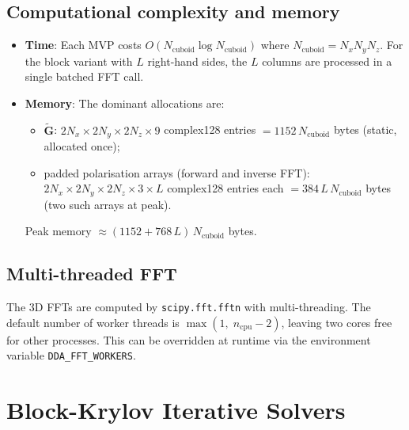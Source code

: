 \documentclass[11pt,a4paper]{article}
\begin{document}
\subsection{Computational complexity and memory}
\label{sec:complexity}

\begin{itemize}
  \item \textbf{Time}: Each MVP costs $O(N_{\text{cuboid}} \log N_{\text{cuboid}})$
        where $N_{\text{cuboid}} = N_x N_y N_z$.
        For the block variant with $L$ right-hand sides, the $L$ columns
        are processed in a single batched FFT call.
  \item \textbf{Memory}: The dominant allocations are:
  \begin{itemize}
    \item $\widetilde{\mathbf{G}}$:
          $2N_x \times 2N_y \times 2N_z \times 9$ complex128 entries
          $= 1152\,N_{\text{cuboid}}$ bytes (static, allocated once);
    \item padded polarisation arrays (forward and inverse FFT):
          $2N_x \times 2N_y \times 2N_z \times 3 \times L$ complex128
          entries each $= 384\,L\,N_{\text{cuboid}}$ bytes (two such arrays
          at peak).
  \end{itemize}
  Peak memory $\approx (1152 + 768\,L)\,N_{\text{cuboid}}$ bytes.
\end{itemize}

\subsection{Multi-threaded FFT}
\label{sec:fft-workers}

The 3D FFTs are computed by \texttt{scipy.fft.fftn} with multi-threading.
The default number of worker threads is
$\max(1,\; n_{\text{cpu}} - 2)$, leaving two cores free for other
processes.
This can be overridden at runtime via the environment variable
\texttt{DDA\_FFT\_WORKERS}.

\section{Block-Krylov Iterative Solvers}
\label{sec:block-krylov}
\end{document}
